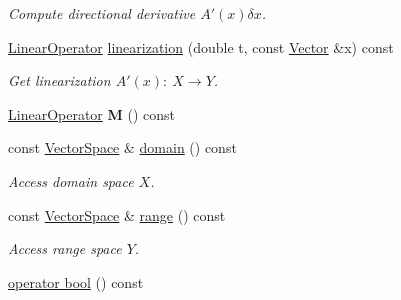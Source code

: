 \begin{DoxyCompactItemize}
\begin{DoxyCompactList}\small\item\em Compute directional derivative $A'(x)\delta x$. \end{DoxyCompactList}\item 
\hypertarget{classSpacy_1_1DynamicC1Operator_a3beba5b0012422e11b9c989efe0e224b}{}\hyperlink{classSpacy_1_1LinearOperator}{Linear\+Operator} \hyperlink{classSpacy_1_1DynamicC1Operator_a3beba5b0012422e11b9c989efe0e224b}{linearization} (double t, const \hyperlink{classSpacy_1_1Vector}{Vector} \&x) const \label{classSpacy_1_1DynamicC1Operator_a3beba5b0012422e11b9c989efe0e224b}

\begin{DoxyCompactList}\small\item\em Get linearization $A'(x):\ X\to Y $. \end{DoxyCompactList}\item 
\hypertarget{classSpacy_1_1DynamicC1Operator_a8bef5bf8f2a8dd4e16ba39da1bda78d3}{}\hyperlink{classSpacy_1_1LinearOperator}{Linear\+Operator} {\bfseries M} () const \label{classSpacy_1_1DynamicC1Operator_a8bef5bf8f2a8dd4e16ba39da1bda78d3}

\item 
\hypertarget{classSpacy_1_1DynamicC1Operator_ac8633283f219699d6a696e866f98fed6}{}const \hyperlink{classSpacy_1_1VectorSpace}{Vector\+Space} \& \hyperlink{classSpacy_1_1DynamicC1Operator_ac8633283f219699d6a696e866f98fed6}{domain} () const \label{classSpacy_1_1DynamicC1Operator_ac8633283f219699d6a696e866f98fed6}

\begin{DoxyCompactList}\small\item\em Access domain space $X$. \end{DoxyCompactList}\item 
\hypertarget{classSpacy_1_1DynamicC1Operator_a15daaabb27566457a0a3df02a13f9d96}{}const \hyperlink{classSpacy_1_1VectorSpace}{Vector\+Space} \& \hyperlink{classSpacy_1_1DynamicC1Operator_a15daaabb27566457a0a3df02a13f9d96}{range} () const \label{classSpacy_1_1DynamicC1Operator_a15daaabb27566457a0a3df02a13f9d96}

\begin{DoxyCompactList}\small\item\em Access range space $Y$. \end{DoxyCompactList}\item 
\hypertarget{classSpacy_1_1DynamicC1Operator_ad63239243940b504e624f86836526198}{}\hyperlink{classSpacy_1_1DynamicC1Operator_ad63239243940b504e624f86836526198}{operator bool} () const \label{classSpacy_1_1DynamicC1Operator_ad63239243940b504e624f86836526198}


\end{DoxyCompactItemize}
